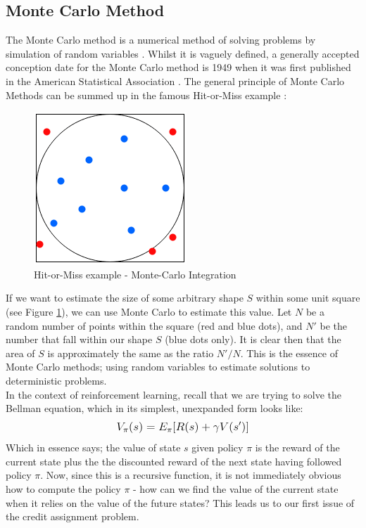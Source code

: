 \documentclass[12pt]{article}
\begin{document}
\subsection{Monte Carlo Method}\label{mcmethod}
The Monte Carlo method is a numerical method of solving problems by simulation of random variables \autocite{SobolI.M.IliaMeerovich1994Apft}. Whilst it is vaguely defined, a generally accepted conception date for the Monte Carlo method is 1949 when it was first published in the American Statistical Association \autocite{10.2307/2280232}. The general principle of Monte Carlo Methods can be summed up in the famous Hit-or-Miss example \autocite{SobolI.M.IliaMeerovich1994Apft,Robert2004}:
\begin{figure}[H]
    \centering
    \includegraphics[scale=0.7]{7.png}
    \caption{Hit-or-Miss example - Monte-Carlo Integration}
    \label{hom}
\end{figure}
If we want to estimate the size of some arbitrary shape $S$ within some unit square (see Figure \ref{hom}), we can use Monte Carlo to estimate this value. Let $N$ be a random number of points within the square (red and blue dots), and $N'$ be the number that fall within our shape $S$ (blue dots only). It is clear then that the area of $S$ is approximately the same as the ratio $N'/N$. This is the essence of Monte Carlo methods; using random variables to estimate solutions to deterministic problems. \\\newline
In the context of reinforcement learning, recall that we are trying to solve the Bellman equation, which in its simplest, unexpanded form looks like:
\begin{equation}
    \mathlarger{
        V_{\pi}(s) = E_\pi[R(s) + \gamma V(s')]
    }
\end{equation}
Which in essence says; the value of state $s$ given policy $\pi$ is the reward of the current state plus the the discounted reward of the next state having followed policy $\pi$. Now, since this is a recursive function, it is not immediately obvious how to compute the policy $\pi$ - how can we find the value of the current state when it relies on the value of the future states? This leads us to our first issue of the credit assignment problem.\\
\end{document}
